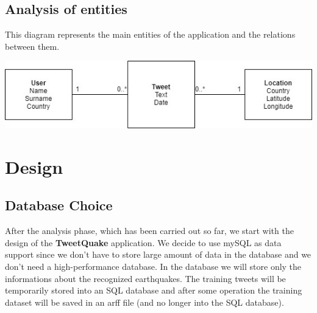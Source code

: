 \documentclass[a4paper, oneside]{article}
\begin{document}
\subsection{Analysis of entities}
This diagram represents the main entities of the application and the relations between them.
\begin{minipage}{\linewidth}
\begin{center}
\vspace{4mm}
\includegraphics[width = 1\textwidth]{./images/diagrams/Uml Analysis diagram} 
\vspace{2mm}
\label{fig:useCases}
\end{center}
\end{minipage}



\clearpage
\section{Design}

\subsection{Database Choice}
After the analysis phase, which has been carried out so far, we start with the design of the \textbf{TweetQuake} application. We decide to use mySQL as data support since we don't have to store large amount of data in the database and we don't need a high-performance database. In the database we will store only the informations about the recognized earthquakes. The training tweets will be temporarily stored into an SQL database and after some operation the training dataset will be saved in an arff file (and no longer into the SQL database).
\end{document}
